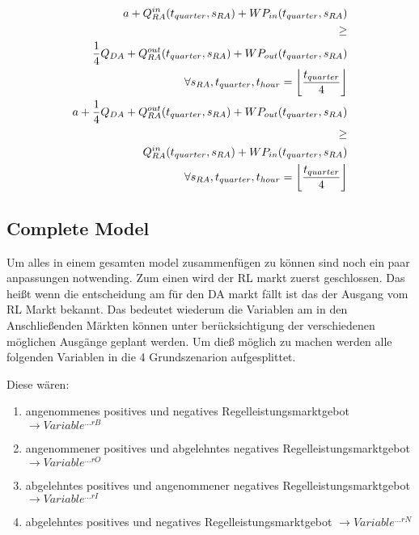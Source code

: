 \begin{alignat}{3}
	a + Q^{in}_{RA}(t_{quarter}, s_{RA}) +  WP_{in}(t_{quarter}, s_{RA}) \notag                                             \\
	\geq \notag                                                                                                             \\
	\frac{1}{4} Q_{DA}  + Q^{out}_{RA}(t_{quarter}, s_{RA}) + WP_{out}(t_{quarter}, s_{RA}) \notag                          \\
	\quad \forall s_{RA},  t_{quarter},  t_{hour} = \left\lfloor \frac{t_{quarter}}{4}\right\rfloor\label{eq:a_general_pos} \\
	a + \frac{1}{4}Q_{DA} +  Q^{out}_{RA}(t_{quarter}, s_{RA}) + WP_{out}(t_{quarter}, s_{RA}) \notag                       \\
	\geq \notag                                                                                                             \\
	Q^{in}_{RA}(t_{quarter}, s_{RA}) +  WP_{in}(t_{quarter}, s_{RA}) \notag                                                 \\
	\quad \forall s_{RA},  t_{quarter},  t_{hour} = \left\lfloor \frac{t_{quarter}}{4}\right\rfloor \label{eq:a_general_neg}
\end{alignat}



\subsection{Complete Model}
\label{subsec:completeModel}
Um alles in einem gesamten model zusammenfügen zu können sind noch ein paar anpassungen notwending.
Zum einen wird der RL markt zuerst geschlossen. Das heißt wenn die entscheidung am für den DA markt fällt ist das der Ausgang vom RL Markt bekannt.
Das bedeutet wiederum die Variablen am in den Anschließenden Märkten können unter berücksichtigung der verschiedenen möglichen Ausgänge geplant werden.
Um dieß möglich zu machen werden alle folgenden Variablen in die 4 Grundszenarion aufgesplittet.

Diese wären:
\begin{enumerate}
	\item angenommenes positives und negatives Regelleistungsmarktgebot	$\rightarrow Variable^{...rB}$
	\item angenommener positives und abgelehntes negatives Regelleistungsmarktgebot $\rightarrow Variable^{...rO}$
	\item abgelehntes positives und angenommener negatives Regelleistungsmarktgebot $\rightarrow Variable^{...rI}$
	\item abgelehntes positives und negatives Regelleistungsmarktgebot $\rightarrow Variable^{...rN}$
\end{enumerate}

